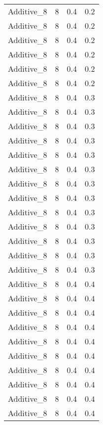 \documentclass{article}
\begin{document}
\begin{longtable}[H]{lrrr}
 Additive\_8 &       8 &   0.4 &            0.2 \\
 Additive\_8 &       8 &   0.4 &            0.2 \\
 Additive\_8 &       8 &   0.4 &            0.2 \\
 Additive\_8 &       8 &   0.4 &            0.2 \\
 Additive\_8 &       8 &   0.4 &            0.2 \\
 Additive\_8 &       8 &   0.4 &            0.2 \\
 Additive\_8 &       8 &   0.4 &            0.3 \\
 Additive\_8 &       8 &   0.4 &            0.3 \\
 Additive\_8 &       8 &   0.4 &            0.3 \\
 Additive\_8 &       8 &   0.4 &            0.3 \\
 Additive\_8 &       8 &   0.4 &            0.3 \\
 Additive\_8 &       8 &   0.4 &            0.3 \\
 Additive\_8 &       8 &   0.4 &            0.3 \\
 Additive\_8 &       8 &   0.4 &            0.3 \\
 Additive\_8 &       8 &   0.4 &            0.3 \\
 Additive\_8 &       8 &   0.4 &            0.3 \\
 Additive\_8 &       8 &   0.4 &            0.3 \\
 Additive\_8 &       8 &   0.4 &            0.3 \\
 Additive\_8 &       8 &   0.4 &            0.3 \\
 Additive\_8 &       8 &   0.4 &            0.4 \\
 Additive\_8 &       8 &   0.4 &            0.4 \\
 Additive\_8 &       8 &   0.4 &            0.4 \\
 Additive\_8 &       8 &   0.4 &            0.4 \\
 Additive\_8 &       8 &   0.4 &            0.4 \\
 Additive\_8 &       8 &   0.4 &            0.4 \\
 Additive\_8 &       8 &   0.4 &            0.4 \\
 Additive\_8 &       8 &   0.4 &            0.4 \\
 Additive\_8 &       8 &   0.4 &            0.4 \\
 Additive\_8 &       8 &   0.4 &            0.4 \\

\end{longtable}
\end{document}
